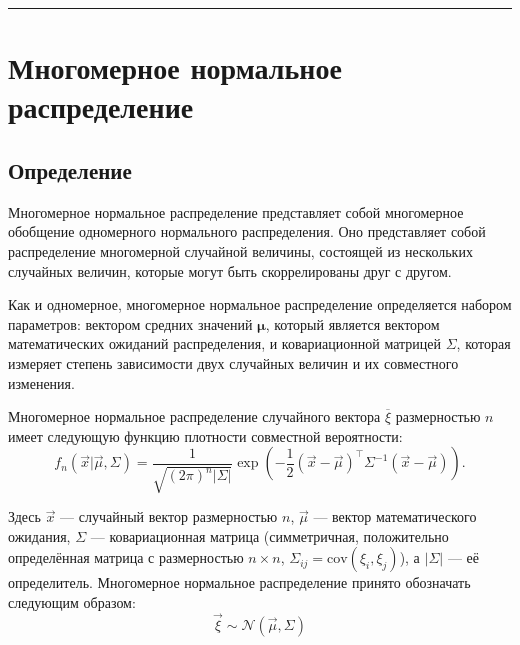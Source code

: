 \documentclass[11pt,a4paper]{article}
\begin{document}
    \begin{center}\rule{0.5\linewidth}{0.5pt}\end{center}

    \hypertarget{ux43cux43dux43eux433ux43eux43cux435ux440ux43dux43eux435-ux43dux43eux440ux43cux430ux43bux44cux43dux43eux435-ux440ux430ux441ux43fux440ux435ux434ux435ux43bux435ux43dux438ux435}{%
\section{Многомерное нормальное
распределение}\label{ux43cux43dux43eux433ux43eux43cux435ux440ux43dux43eux435-ux43dux43eux440ux43cux430ux43bux44cux43dux43eux435-ux440ux430ux441ux43fux440ux435ux434ux435ux43bux435ux43dux438ux435}}

    \hypertarget{ux43eux43fux440ux435ux434ux435ux43bux435ux43dux438ux435}{%
\subsection{Определение}\label{ux43eux43fux440ux435ux434ux435ux43bux435ux43dux438ux435}}

Многомерное нормальное распределение представляет собой многомерное
обобщение одномерного нормального распределения. Оно представляет собой
распределение многомерной случайной величины, состоящей из нескольких
случайных величин, которые могут быть скоррелированы друг с другом.

Как и одномерное, многомерное нормальное распределение определяется
набором параметров: вектором средних значений \(\mathbf{\mu}\), который
является вектором математических ожиданий распределения, и
ковариационной матрицей \(\Sigma\), которая измеряет степень зависимости
двух случайных величин и их совместного изменения.

Многомерное нормальное распределение случайного вектора
\(\overline{\xi}\) размерностью \(n\) имеет следующую функцию плотности
совместной вероятности: \[
  f_n(\vec{x}|\vec{\mu}, \Sigma) = \frac{1}{\sqrt{(2\pi)^n |\Sigma|}} \exp{ \left( -\frac{1}{2}(\vec{x} - \vec{\mu})^\top \Sigma^{-1} (\vec{x} - \vec{\mu}) \right)}.
\]

Здесь \(\vec{x}\) --- случайный вектор размерностью \(n\), \(\vec{\mu}\)
--- вектор математического ожидания, \(\Sigma\) --- ковариационная
матрица (симметричная, положительно определённая матрица с размерностью
\(n \times n\), \(\Sigma_{ij} = \text{cov}(\xi_i, \xi_j)\)), а
\(\lvert\Sigma\rvert\) --- её определитель. Многомерное нормальное
распределение принято обозначать следующим образом: \[
  \vec{\xi} \sim \mathcal{N}(\vec{\mu}, \Sigma)
\]
\end{document}
